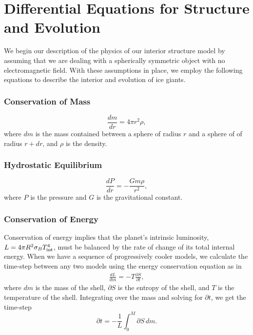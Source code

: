 \documentclass[11pt]{ucscthesisbs}
\begin{document}
\section{Differential Equations for Structure and Evolution}
\label{Three-layer Model with Dry Adiabat}
We begin our description of the physics of our interior structure model by assuming that we are dealing with a spherically symmetric object with no electromagnetic field.  With these assumptions in place, we employ the following equations to describe the interior and evolution of ice giants.
\subsubsection{Conservation of Mass}
\begin{equation}
  \frac{dm}{dr} =4 \pi r^{2}\rho  ,
\end{equation}
where $dm$ is the mass contained between a sphere of radius $r$ and a sphere of of radius $r + dr$, and $\rho$ is the density. 
\subsubsection{Hydrostatic Equilibrium}
\begin{equation}
  \frac{dP}{dr} = -\frac{Gm\rho}{r^{2}}  ,
\end{equation}
where $P$ is the pressure and $G$ is the gravitational constant. 
\subsubsection{Conservation of Energy}
Conservation of energy implies that the planet's intrinsic luminosity, $L = 4\pi R^2\sigma_{B}T_{\rm int}^4$, 
must be balanced by the rate of change of its total internal energy. When we have a sequence of progressively cooler models, we calculate the time-step between any two models using the energy conservation equation as in \citep{fortney_2011}
\begin{align}
\frac{dL}{dm}= -T\frac{\partial S}{\partial t},
\label{eq:energy_conservation}
\end{align}
where $dm$ is the mass of the shell, $\partial S$ is the entropy of the shell, and $T$ is the temperature of the shell. Integrating over the mass and solving for $\partial t$, we get the time-step
\begin{equation}
\partial t = -\frac{1}{L} \int_{0}^{M} \partial S \,dm .
\label{eq:timestep}
\end{equation}
\end{document}
